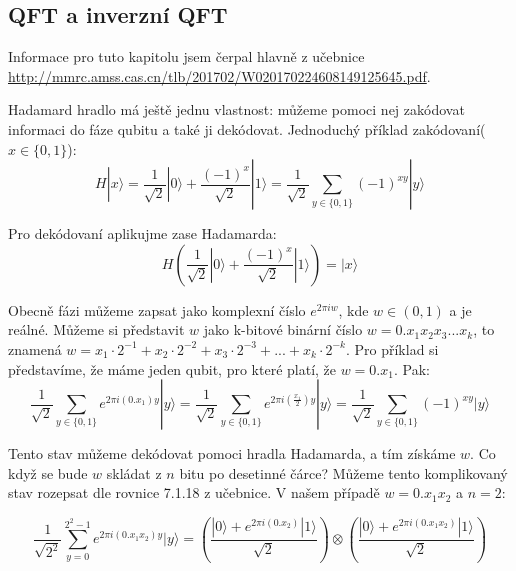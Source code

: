 \documentclass[11pt]{article}
\begin{document}
\subsection{QFT a inverzní QFT}
\label{sec:qft}
Informace pro tuto kapitolu jsem čerpal hlavně z učebnice \url{http://mmrc.amss.cas.cn/tlb/201702/W020170224608149125645.pdf}.
\par Hadamard hradlo má ještě jednu vlastnost: můžeme pomoci nej zakódovat informaci do fáze qubitu a také ji dekódovat.
Jednoduchý příklad zakódovaní($x\in\{0,1\}$):
$$H|x\rangle = \frac{1}{\sqrt{2}}|0\rangle + \frac{(-1)^x}{\sqrt{2}}|1\rangle = \frac{1}{\sqrt{2}}\displaystyle\sum_{y\in\{0, 1\}} (-1)^{xy}|y\rangle$$
\par Pro dekódovaní aplikujme zase Hadamarda:
$$H\left(\frac{1}{\sqrt{2}}|0\rangle + \frac{(-1)^x}{\sqrt{2}}|1\rangle\right) = |x\rangle$$
\par Obecně fázi můžeme zapsat jako komplexní číslo $e^{2\pi i w}$, kde $w\in(0, 1)$ a je reálné.
Můžeme si představit $w$ jako k-bitové binární číslo $w=0.x_1x_2x_3...x_k$, to znamená $w = x_1 \cdot 2^{-1} + x_2 \cdot 2^{-2} + x_3 \cdot 2^{-3} + ... + x_k \cdot 2^{-k}$.
Pro příklad si představíme, že máme jeden qubit, pro které platí, že $w=0.x_1$.
Pak:
$$
    \frac{1}{\sqrt{2}}\displaystyle\sum_{y\in\{0, 1\}} e^{2\pi i (0.x_1) y}|y\rangle =
    \frac{1}{\sqrt{2}}\displaystyle\sum_{y\in\{0, 1\}} e^{2\pi i (\frac{x_1}{2}) y}|y\rangle =
    \frac{1}{\sqrt{2}}\displaystyle\sum_{y\in\{0, 1\}} (-1)^{xy}|y\rangle
$$
\par Tento stav můžeme dekódovat pomoci hradla Hadamarda, a tím získáme $w$.
Co když se bude $w$ skládat z $n$ bitu po desetinné čárce?
Můžeme tento komplikovaný stav rozepsat dle rovnice 7.1.18 z učebnice.
V našem případě $w=0.x_1x_2$ a $n=2$:

$$
    \frac{1}{\sqrt{2^2}}\displaystyle\sum_{y=0}^{2^2 - 1} e^{2\pi i (0.x_1x_2) y}|y\rangle =
    \left(\frac{|0\rangle + e^{2\pi i (0.x_2)}|1\rangle}{\sqrt{2}}\right) \otimes
    \left(\frac{|0\rangle + e^{2\pi i (0.x_1x_2)}|1\rangle}{\sqrt{2}}\right)
$$
\end{document}
